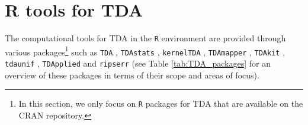 \documentclass{article}
\begin{document}
\section{R tools for TDA}

The computational tools for TDA in the \texttt{R} environment are provided through various packages\footnote{In this section, we only focus on \texttt{R} packages for TDA that are available on the CRAN repository.} such as \texttt{TDA} \cite{TDA}, \texttt{TDAstats} \cite{wadhwa2018tdastats}, \texttt{kernelTDA} \cite{kernelTDA}, \texttt{TDAmapper} \cite{TDAmapper}, \texttt{TDAkit} \cite{TDAkit}, \texttt{tdaunif} \cite{tdaunif}, \texttt{TDApplied} \cite{TDApplied} and \texttt{ripserr} \cite{ripserr} (see Table \ref{tab:TDA_packages} for an overview of these packages in terms of their scope and areas of focus). 

\newcommand{\cm}{$V$}

\newcommand{\rota}[1]{
  #1
}
\end{document}
